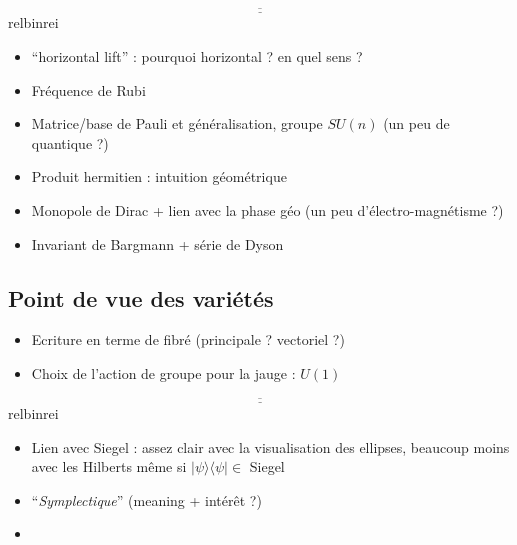 \[\underline{\overline{\qquad\qquad\qquad\qquad\qquad\qquad\qquad\qquad\qquad\qquad\qquad\qquad\qquad\qquad\qquad\qquad\qquad\qquad}}\]{\color{white}relbinrei}

\begin{itemize}
	\item ``horizontal lift'' : pourquoi horizontal ? en quel sens ?
	\item Fréquence de Rubi
	\item Matrice/base de Pauli et généralisation, groupe $SU(n)$ (un peu de quantique ?)
	\item Produit hermitien : intuition géométrique
	\item Monopole de Dirac + lien avec la phase géo (un peu d'électro-magnétisme ?)
	\item Invariant de Bargmann + série de Dyson
\end{itemize}



\subsection{Point de vue des variétés}\label{subsec:phaseG_variete}

\begin{itemize}
	\item Ecriture en terme de fibré (principale ? vectoriel ?)
	
	\item Choix de l'action de groupe pour la jauge : $U(1)$ \apriori
\end{itemize}

\[\underline{\overline{\qquad\qquad\qquad\qquad\qquad\qquad\qquad\qquad\qquad\qquad\qquad\qquad\qquad\qquad\qquad\qquad\qquad\qquad}}\]{\color{white}relbinrei}

\begin{itemize}
	\item Lien avec Siegel : assez clair avec la visualisation des ellipses, beaucoup moins avec les Hilberts même si $| \psi\rangle \langle \psi |\in$ Siegel \apriori
	
	\item ``\textit{Symplectique}'' (meaning + intérêt ?)
	
	\item 
\end{itemize}




\newpage

\listoffigures
\vfill
\lstlistoflistings
\vfill

\newpage

{}

